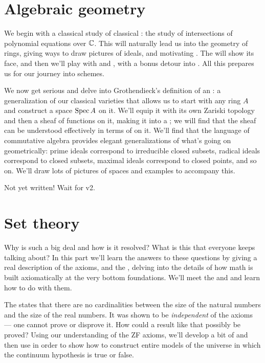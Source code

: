 \section{Algebraic geometry}
\begin{itemize}
We begin with a classical study of classical :
the study of intersections of polynomial equations over $\mathbb C$.
This will naturally lead us into the geometry of rings,
giving ways to draw pictures of ideals,
and motivating .
The  will show its face,
and then we'll play with 
and ,
with a bonus detour into .
All this prepares us for our journey into schemes.

We now get serious and delve into Grothendieck's definition of
an :
a generalization of our classical varieties
that allows us to start with any ring $A$
and construct a space $\operatorname{Spec} A$ on it.
We'll equip it with its own Zariski topology
and then a sheaf of functions on it,
making it into a ;
we will find that the sheaf can be understood
effectively in terms of  on it.
We'll find that the language of commutative algebra provides
elegant generalizations of what's going on geometrically:
prime ideals correspond to irreducible closed subsets,
radical ideals correspond to closed subsets,
maximal ideals correspond to closed points, and so on.
We'll draw lots of pictures of spaces and examples to accompany this.

Not yet written! Wait for v2.
\end{itemize}

\section{Set theory}
\begin{itemize}
Why is  such a big deal
and how is it resolved?
What is this 
that everyone keeps talking about?
In this part we'll learn the answers to these questions
by giving a real description of the 
axioms, and the ,
delving into the details of how math is built axiomatically
at the very bottom foundations.
We'll meet the  and 
and learn how to do  with them.

The 
states that there are no cardinalities
between the size of the natural numbers and the size of the real numbers.
It was shown to be \emph{independent} of the axioms ---
one cannot prove or disprove it.
How could a result like that possibly be proved?
Using our understanding of the ZF axioms,
we'll develop a bit of 
and then use  in order to show
how to construct entire models of the universe
in which the continuum hypothesis is true or false.
\end{itemize}
